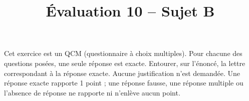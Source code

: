 \documentclass[a4paper,dvipsnames]{article}
\begin{document}
\title{Évaluation 10 -- Sujet B}
\author{}
\date{}

\maketitle{}

\pagestyle{empty}
\thispagestyle{empty}

\exo[4 points] Cet exercice est un QCM (questionnaire à choix multiples). Pour chacune des questions posées, une seule réponse est exacte. Entourer, sur l'énoncé, la lettre correspondant à la réponse exacte. Aucune justification n'est demandée. Une réponse exacte rapporte 1 point ; une réponse fausse, une réponse multiple ou l'absence de réponse ne rapporte ni n'enlève aucun point.

\end{document}
